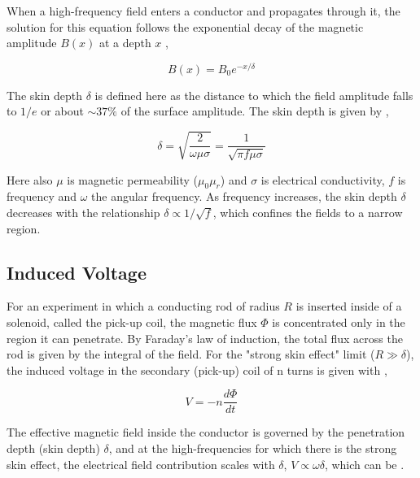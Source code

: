 \documentclass[11pt, a4paper, twocolumn]{article}
\begin{document}
When a high-frequency field enters a conductor and propagates through it, the solution for this equation follows the exponential decay of the magnetic amplitude $B(x)$ at a depth $x$ \cite{griffiths2023introduction,knoepfel2008magnetic},

\begin{equation*}
  B(x) = B_0 e^{-x/\delta}
\end{equation*}

The skin depth $\delta$ is defined here as the distance to which the field amplitude falls to $1/e$ or about $\sim 37\%$ of the surface amplitude. The skin depth is given by \cite{wheeler2006formulas,knoepfel2008magnetic},

\begin{equation} \label{eq:1}
  \delta = \sqrt{\frac{2}{\omega \mu \sigma}} = \frac{1}{\sqrt{\pi f \mu \sigma}}
\end{equation}

Here also $\mu$ is magnetic permeability ($\mu_0\mu_r$) and $\sigma$ is electrical conductivity, $f$ is frequency and $\omega$ the angular frequency. As frequency increases, the skin depth $\delta$ decreases with the relationship $\delta \propto 1/\sqrt{f}$, which confines the fields to a narrow region. \cite{wheeler2006formulas,wiederick,ziolkowska,knoepfel2008magnetic}

\subsection{Induced Voltage}

For an experiment in which a conducting rod of radius $R$ is inserted inside of a solenoid, called the pick-up coil, the magnetic flux $\Phi$ is concentrated only in the region it can penetrate. By Faraday's law of induction, the total flux across the rod is given by the integral of the field. For the "strong skin effect" limit ($R \gg \delta$), the induced voltage in the secondary (pick-up) coil of n turns is given with \cite{wiederick},

\begin{equation*}
  V = - n \frac{d \Phi}{d t}
\end{equation*}

The effective magnetic field inside the conductor is governed by the penetration depth (skin depth) $\delta$, and at the high-frequencies for which there is the strong skin effect, the electrical field contribution scales with $\delta$, $V \propto \omega\delta$, which can be . \cite{wiederick}
\end{document}
